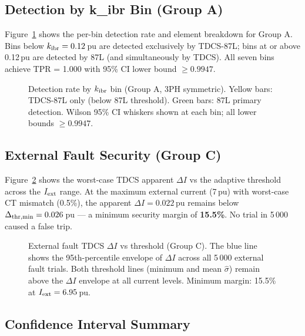 \documentclass[11pt,a4paper]{article}
\begin{document}
\subsection{Detection by k\_ibr Bin (Group A)}

Figure~\ref{fig:kbins} shows the per-bin detection rate and element
breakdown for Group A.  Bins below $k_{\rm ibr} = 0.12$\,pu are detected
exclusively by TDCS-87L; bins at or above 0.12\,pu are detected by 87L
(and simultaneously by TDCS).  All seven bins achieve TPR = 1.000
with 95\% CI lower bound $\geq 0.9947$.

\begin{figure}[h!]
  \centering
  
  \caption{Detection rate by $k_{\rm ibr}$ bin (Group A, 3PH symmetric).
           Yellow bars: TDCS-87L only (below 87L threshold).
           Green bars: 87L primary detection.  Wilson 95\% CI whiskers
           shown at each bin; all lower bounds $\geq 0.9947$.}
  \label{fig:kbins}
\end{figure}

\subsection{External Fault Security (Group C)}

Figure~\ref{fig:security} shows the worst-case TDCS apparent $\Delta I$
vs the adaptive threshold across the $I_{\rm ext}$ range.  At the maximum
external current (7\,pu) with worst-case CT mismatch (0.5\%), the apparent
$\Delta I = 0.022$\,pu remains below $\Delta_{\rm thr,min} = 0.026$\,pu
— a minimum security margin of \textbf{15.5\%}.  No trial in 5\,000
caused a false trip.

\begin{figure}[h!]
  \centering
  
  \caption{External fault TDCS $\Delta I$ vs threshold (Group C).  The
           blue line shows the 95th-percentile envelope of $\Delta I$
           across all 5\,000 external fault trials.  Both threshold
           lines (minimum and mean $\hat{\sigma}$) remain above the
           $\Delta I$ envelope at all current levels.  Minimum margin:
           15.5\% at $I_{\rm ext} = 6.95$\,pu.}
  \label{fig:security}
\end{figure}

\subsection{Confidence Interval Summary}
\end{document}
